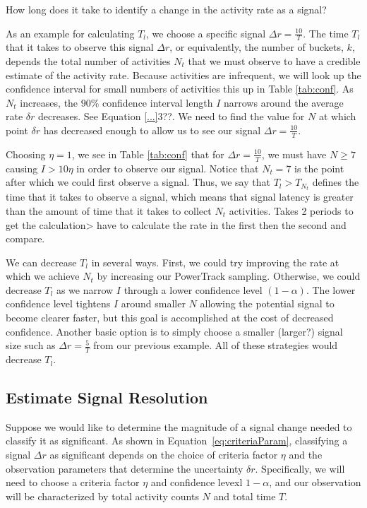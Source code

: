 \documentclass{article}
\begin{document}
How long does it take to identify a change in the activity rate as a signal?

As an example for calculating $T_{l}$, we choose a specific signal $\Delta r = \frac{10}{T}$.  The time $T_{l}$ that it takes to observe this signal $\Delta r$, or equivalently, the number of buckets, $k$, depends the total number of activities $N_t$ that we must observe to have a credible estimate of the activity rate. Because activities are infrequent, we will look up the confidence interval for small numbers of activities this up in Table \ref{tab:conf}.  As $N_t$ increases, the $90\%$ confidence interval length $I$ narrows around the average rate $\delta r$ decreases.  See Equation \ref{...}3??.  We need to find the value for $N$ at which point $\delta r$ has decreased enough to allow us to see our signal $\Delta r = \frac{10}{T}$.  

Choosing $\eta=1$, we see in Table \ref{tab:conf} that for $\Delta r = \frac{10}{T}$, we must have $N\geq7$ causing $I > 10\eta$ in order to observe our signal.  Notice that $N_t=7$ is the point after which we could first observe a signal.  Thus, we say that $T_{l}>T_{N_t}$ defines the time that it takes to observe a signal, which means that signal latency is greater than the amount of time that it takes to collect $N_t$ activities.  Takes 2 periods to get the calculation> have to calculate the rate in the first then the second and compare.

We can decrease $T_{l}$ in several ways.  First, we could try improving the rate at which we achieve $N_t$ by  increasing our PowerTrack sampling.  Otherwise, we could decrease $T_{l}$ as we narrow $I$ through a lower confidence level $(1-\alpha)$.  The lower confidence level tightens $I$ around smaller $N$ allowing the potential signal to become clearer faster, but this goal is accomplished at the cost of decreased confidence.  Another basic option is to simply choose a smaller (larger?) signal size such as $\Delta r = \frac{5}{T}$ from our previous example.  All of these strategies would decrease $T_{l}$.



\subsection{Estimate Signal Resolution}

Suppose we would like to determine the magnitude of a signal change needed to 
classify it as significant. As shown in Equation~\ref{eq:criteriaParam}, 
classifying a signal $\Delta r$ as significant depends on the choice of criteria factor 
$\eta$ and the observation parameters that determine the uncertainty $\delta r$. 
Specifically, we will need to choose a criteria factor $\eta$ and confidence levexl 
$1-\alpha$, and our observation will be characterized by total activity counts $N$ 
and total time $T$.
\end{document}
